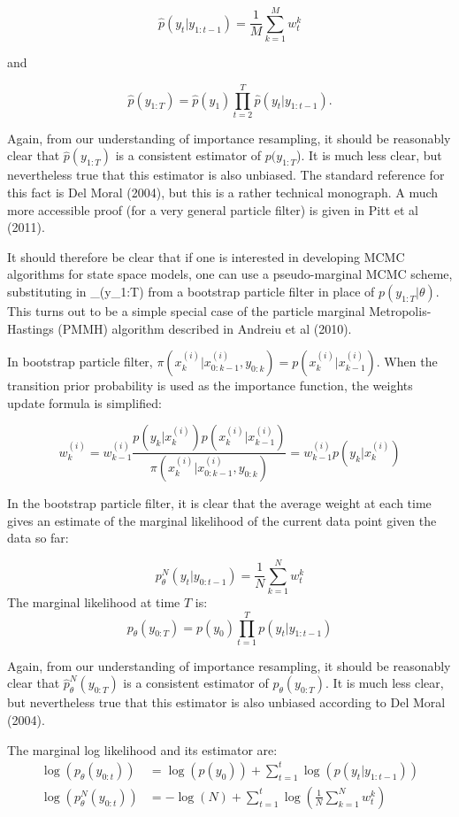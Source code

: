 \documentclass[11pt,a4,twosided,singlespacing,titlepagenumber=on]{scrreprt}
\numberwithin{equation}{chapter} %
\theoremstyle{remark}
\begin{document}
$$\displaystyle \hat{p}(y_t|y_{1:t-1})=\frac{1}{M}\sum_{k=1}^M w_t^k$$

and

$$\displaystyle \hat{p}(y_{1:T}) = \hat{p}(y_1)\prod_{t=2}^T \hat{p}(y_t|y_{1:t-1}).$$

Again, from our understanding of importance resampling, it should be reasonably clear that $\hat{p}(y_{1:T})$ is a consistent estimator of ${p}(y_{1:T}$). It is much less clear, but nevertheless true that this estimator is also unbiased. The standard reference for this fact is Del Moral (2004), but this is a rather technical monograph. A much more accessible proof (for a very general particle filter) is given in Pitt et al (2011).

It should therefore be clear that if one is interested in developing MCMC algorithms for state space models, one can use a pseudo-marginal MCMC scheme, substituting in _\theta(y_{1:T}) from a bootstrap particle filter in place of $p(y_{1:T}|\theta)$. This turns out to be a simple special case of the particle marginal Metropolis-Hastings (PMMH) algorithm described in Andreiu et al (2010). 

In bootstrap particle filter, $\pi(x_k^{(i)} | x_{0:k-1}^{(i)}, y_{0:k}) = p(x_k^{(i)}|x_{k-1}^{(i)})$. When the transition prior probability is used as the importance function, the weights update formula is simplified:

$$
w_k^{(i)} = w_{k-1}^{(i)} \frac{p(y_k|x_k^{(i)})p(x_k^{(i)}|x^{(i)}_{k-1})}{\pi(x_k^{(i)}|x^{(i)}_{0:k-1},y_{0:k})}= w_{k-1}^{(i)} p(y_k|x_k^{(i)})
$$ 

In the bootstrap particle filter, it is clear that the average weight at each time gives an estimate of the marginal likelihood of the current data point given the data so far:

$$ p^N_{\theta}(y_t | y_{0:t-1}) = \frac{1}{N} \sum_{k=1}^N w_t^k$$
The marginal likelihood at time $T$ is:
$$ p_{\theta}(y_{0:T}) = p(y_0)\prod_{t=1}^T p(y_t | y_{1:t-1})$$

Again, from our understanding of importance resampling, it should be reasonably clear that $\hat{p}^N_{\theta}(y_{0:T})$ is a consistent estimator of $p_{\theta}(y_{0:T})$. It is much less clear, but nevertheless true that this estimator is also unbiased according to Del Moral (2004).

The marginal log likelihood and its estimator are:
\begin{align*}
\log(p_{\theta}(y_{0:t})) &= \log(p(y_0)) + \sum_{t=1}^t \log \left(p(y_t | y_{1:t-1}) \right) \\
\log(p^N_{\theta}(y_{0:t})) &= - \log(N) + \sum_{t=1}^t \log \left(\frac{1}{N} \sum_{k=1}^N w_t^k \right)
\end{align*}
\end{document}
